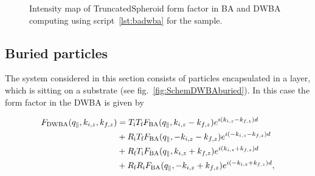 \begin{figure}[tb]
\hfill
{}
\hfill
{}
\hfill
\caption{Intensity map of TruncatedSpheroid form factor in BA and DWBA computing using script~\ref{lst:badwba} for the sample.}
\label{fig:spheroidbadwba}
\end{figure}

\FloatBarrier 


\subsection{Buried particles} 

The system considered in this section consists of particles encapsulated in a layer, which is sitting on a substrate (see fig.~\ref{fig:SchemDWBAburied}). In this case the form factor in the DWBA is given by

\begin{align}
  F_{\rm{DWBA}}(q_{\parallel}, k_{i,z}, k_{f,z})
  &= T_\text{i} T_\text{f} F_{\rm{BA}}(q_{\parallel}, k_{i,z}-k_{f,z})e^{i(k_{i,z}-k_{f,z})d}\nonumber \\
  &+ R_\text{i} T_\text{f} F_{\rm{BA}}(q_{\parallel}, -k_{i,z}-k_{f,z})e^{i(-k_{i,z}-k_{f,z})d} \nonumber \\
  &+ R_\text{f} T_\text{i} F_{\rm{BA}}(q_{\parallel}, k_{i,z}+k_{f,z}) e^{i(k_{i,z}+k_{f,z})d}\nonumber \\
  &+ R_\text{f} R_\text{i}F_{\rm{BA}}(q_{\parallel},-k_{i,z}+k_{f,z})e^{i(-k_{i,z}+k_{f,z})d}, \label{Edwbaburied}
\end{align}

